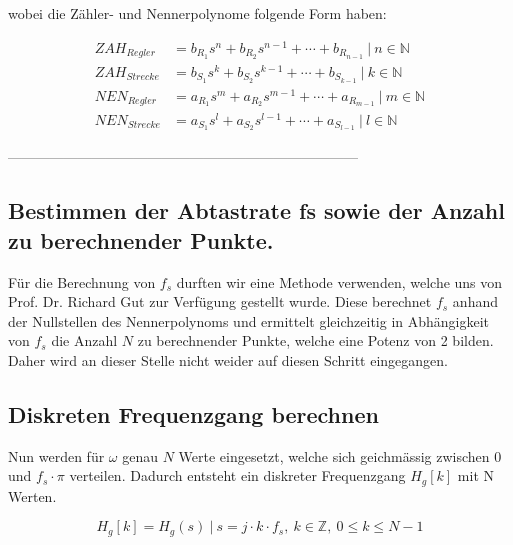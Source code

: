 wobei die Z\"ahler- und Nennerpolynome folgende Form haben:

\begin{align*}
    ZAH_{Regler}  & = b_{R_1} s^n  + b_{R_2} s^{n-1}  + \dotsb  + b_{R_{n-1}}     ~|~ n \in  \mathbb{N} \\
    ZAH_{Strecke} & = b_{S_1} s^k  + b_{S_2} s^{k-1}  + \dotsb  + b_{S_{k-1}}     ~|~ k \in  \mathbb{N}  \\
    NEN_{Regler}  & = a_{R_1} s^m  + a_{R_2} s^{m-1}  + \dotsb  + a_{R_{m-1}}     ~|~ m \in  \mathbb{N}  \\
    NEN_{Strecke} & = a_{S_1} s^l  + a_{S_2} s^{l-1}  + \dotsb  + a_{S_{l-1}}     ~|~ l \in  \mathbb{N}
\end{align*}


 --------------------------------------------------------------------------- %
\subsection{Bestimmen der Abtastrate fs sowie der Anzahl zu berechnender Punkte.}
F\"ur die Berechnung von $f_s$ durften  wir eine Methode verwenden, welche uns
von  Prof. Dr. Richard Gut  zur  Verf\"ugung  gestellt wurde. Diese  berechnet
$f_s$ anhand der Nullstellen des  Nennerpolynoms und ermittelt gleichzeitig in
Abh\"angigkeit von  $f_s$ die Anzahl  $N$ zu berechnender Punkte,  welche eine
Potenz von  2 bilden. Daher wird an dieser Stelle nicht weider auf diesen Schritt eingegangen.


\subsection{Diskreten Frequenzgang berechnen}

Nun  werden   f\"ur  $\omega$   genau  $N$   Werte  eingesetzt,   welche  sich
geichm\"assig zwischen 0 und $f_s  \cdot \pi$ verteilen. Dadurch entsteht ein
diskreter Frequenzgang $H_g[k]$ mit N Werten.

\begin{equation*}
    H_g[k] = H_g(s) ~|~ s=j \cdot k \cdot f_s,~k \in \mathbb{Z},~0 \leq k \leq N-1
\end{equation*}


